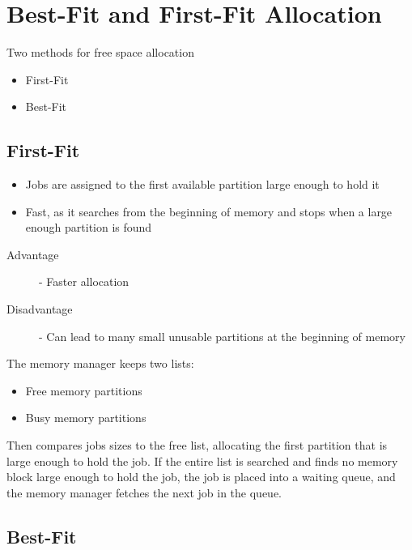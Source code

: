 \documentclass[12pt letter]{report}
\begin{document}
\section{Best-Fit and First-Fit Allocation}

Two methods for free space allocation
\begin{itemize}
  \item First-Fit
  \item Best-Fit
\end{itemize}

\subsection{First-Fit}

\begin{itemize}
  \item Jobs are assigned to the first available partition large enough to hold it
  \item Fast, as it searches from the beginning of memory and stops when a large enough partition is found
\end{itemize}

\begin{description}
  \item[Advantage]  - Faster allocation
  \item [Disadvantage] - Can lead to many small unusable partitions at the beginning of memory
\end{description}

The memory manager keeps two lists:
\begin{itemize}
  \item Free memory partitions
  \item Busy memory partitions
\end{itemize}
Then compares jobs sizes to the free list, allocating the first partition that is large enough to hold the job. If the entire list is searched and finds no memory block large enough to hold the job, the job is placed into a waiting queue, and the memory manager fetches the next job in the queue.

\subsection{Best-Fit}

\end{document}
